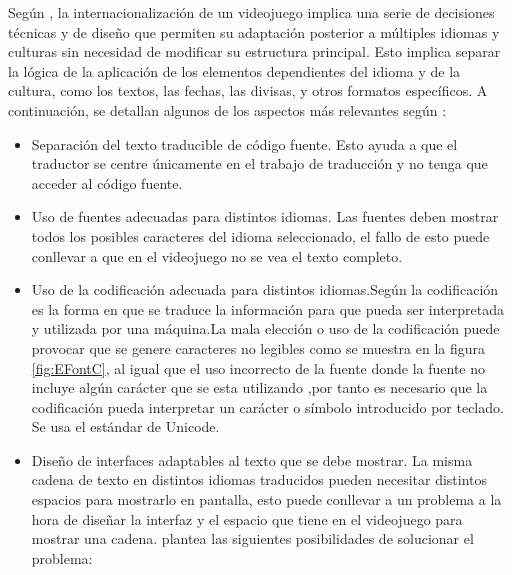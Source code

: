 Según \cite{LQAPSM2017}, la internacionalización de un videojuego implica una serie de decisiones técnicas y de diseño que permiten su adaptación posterior a múltiples idiomas y culturas sin necesidad de modificar su estructura principal. Esto implica separar la lógica de la aplicación de los elementos dependientes del idioma y de la cultura, como los textos, las fechas, las divisas, y otros formatos específicos. A continuación, se detallan algunos de los aspectos más relevantes según  \cite{LQAPSM2017}:
\begin{itemize}
	\item Separación del texto traducible de código fuente. Esto ayuda a que el traductor se centre únicamente en el trabajo de traducción y no tenga que acceder al código fuente.
	\item Uso de fuentes adecuadas para distintos idiomas. Las fuentes deben mostrar todos los posibles caracteres del idioma seleccionado, el fallo de esto puede conllevar a que en el videojuego no se vea el texto completo.
	\item Uso de la codificación adecuada para distintos idiomas.Según \cite{Codificacion} la codificación es la forma en que se traduce la información para que pueda ser interpretada y utilizada por una máquina.La mala elección o uso de la codificación puede provocar que se genere caracteres no legibles como se muestra en la figura \ref{fig:EFontC}, al igual que el uso incorrecto de la fuente donde la fuente no incluye algún carácter que se esta utilizando ,por tanto es necesario que la codificación pueda interpretar un carácter o símbolo introducido por teclado. Se usa el estándar de Unicode.
	\item Diseño de interfaces adaptables al texto que se debe mostrar. La misma cadena de texto en distintos idiomas traducidos pueden necesitar distintos espacios para mostrarlo en pantalla, esto puede conllevar a un problema a la hora de diseñar la interfaz y el espacio que tiene en el videojuego para mostrar una cadena.
	\cite{LQAPSM2017} plantea las siguientes posibilidades de solucionar el problema:
	

\end{itemize}
